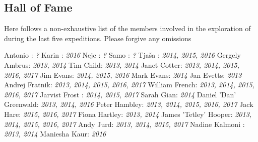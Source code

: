 \begin{tcolorbox}
\begin{fullwidth} 
\chapter{Hall of Fame} 

 Here follows a non-exhaustive list of the members involved in the exploration of  during the last five expeditions. Please forgive any omissions 

 \begin{multicols}{2} 
Antonio : \textsl{? }
\newline
Karin : \textsl{2016 }
\newline
Nejc : \textsl{? }
\newline
Samo : \textsl{? }
\newline
Tja\v{s}a : \textsl{2014, 2015, 2016 }
\newline
Gergely Ambrus: \textsl{2013, 2014 }
\newline
Tim Child: \textsl{2013, 2014 }
\newline
Janet Cotter: \textsl{2013, 2014, 2015, 2016, 2017 }
\newline
Jim Evans: \textsl{2014, 2015, 2016 }
\newline
Mark Evans: \textsl{2014 }
\newline
Jan Evetts: \textsl{2013 }
\newline
Andrej Fratnik: \textsl{2013, 2014, 2015, 2016, 2017 }
\newline
William French: \textsl{2013, 2014, 2015, 2016, 2017 }
\newline
Jarvist Frost : \textsl{2014, 2015, 2017 }
\newline
Sarah Gian: \textsl{2014 }
\newline
Daniel 'Dan' Greenwald: \textsl{2013, 2014, 2016 }
\newline
Peter Hambley: \textsl{2013, 2014, 2015, 2016, 2017 }
\newline
Jack Hare: \textsl{2015, 2016, 2017 }
\newline
Fiona Hartley: \textsl{2013, 2014 }
\newline
James 'Tetley' Hooper: \textsl{2013, 2014, 2015, 2016, 2017 }
\newline
Andy Jurd: \textsl{2013, 2014, 2015, 2017 }
\newline
Nadine Kalmoni : \textsl{2013, 2014 }
\newline
Maniesha Kaur: \textsl{2016 }
\newline

\end{multicols}
\end{fullwidth}
\end{tcolorbox}
